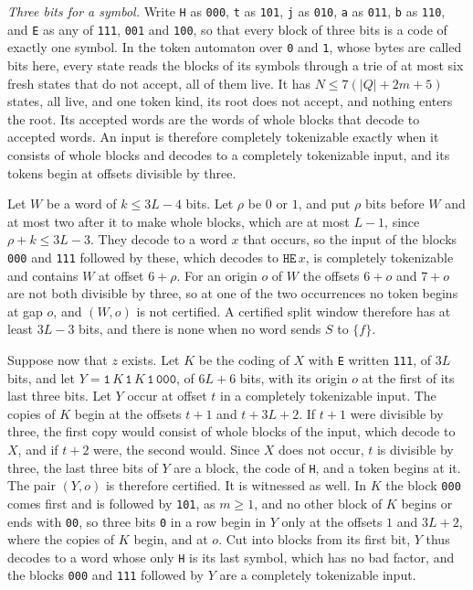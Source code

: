 \documentclass[11pt,a4paper]{article}
\theoremstyle{definition}
\theoremstyle{plain}
\newcommand{\code}[1]{\texttt{#1}}
\begin{document}
\emph{Three bits for a symbol.} Write \code{H} as \code{000}, \code{t} as \code{101}, \code{j} as \code{010}, \code{a}
as \code{011}, \code{b} as \code{110}, and \code{E} as any of \code{111}, \code{001} and \code{100}, so that every block
of three bits is a code of exactly one symbol. In the token automaton over \code{0} and \code{1}, whose bytes are called
bits here, every state reads the blocks of its symbols through a trie of at most six fresh states that do not accept,
all of them live. It has $N \leq 7 (|Q| + 2m + 5)$ states, all live, and one token kind, its root does not accept, and
nothing enters the root. Its accepted words are the words of whole blocks that decode to accepted words. An input is
therefore completely tokenizable exactly when it consists of whole blocks and decodes to a completely tokenizable input,
and its tokens begin at offsets divisible by three.

Let $W$ be a word of $k \leq 3L - 4$ bits. Let $\rho$ be $0$ or $1$, and put $\rho$ bits before $W$ and at most two
after it to make whole blocks, which are at most $L - 1$, since $\rho + k \leq 3L - 3$. They decode to a word $x$ that
occurs, so the input of the blocks \code{000} and \code{111} followed by these, which decodes to $\code{H}\code{E}\, x$,
is completely tokenizable and contains $W$ at offset $6 + \rho$. For an origin $o$ of $W$ the offsets $6 + o$ and
$7 + o$ are not both divisible by three, so at one of the two occurrences no token begins at gap $o$, and $(W, o)$ is
not certified. A certified split window therefore has at least $3L - 3$ bits, and there is none when no word sends $S$
to $\{f\}$.

Suppose now that $z$ exists. Let $K$ be the coding of $X$ with \code{E} written \code{111}, of $3L$ bits, and let
$Y = \code{1}\, K\, \code{1}\, K\, \code{1}\, \code{000}$, of $6L + 6$ bits, with its origin $o$ at the first of its
last three bits. Let $Y$ occur at offset $t$ in a completely tokenizable input. The copies of $K$ begin at the offsets
$t + 1$ and $t + 3L + 2$. If $t + 1$ were divisible by three, the first copy would consist of whole blocks of the input,
which decode to $X$, and if $t + 2$ were, the second would. Since $X$ does not occur, $t$ is divisible by three, the
last three bits of $Y$ are a block, the code of \code{H}, and a token begins at it. The pair $(Y, o)$ is therefore
certified. It is witnessed as well. In $K$ the block \code{000} comes first and is followed by \code{101}, as
$m \geq 1$, and no other block of $K$ begins or ends with \code{00}, so three bits \code{0} in a row begin in $Y$ only
at the offsets $1$ and $3L + 2$, where the copies of $K$ begin, and at $o$. Cut into blocks from its first bit, $Y$ thus
decodes to a word whose only \code{H} is its last symbol, which has no bad factor, and the blocks \code{000} and
\code{111} followed by $Y$ are a completely tokenizable input.
\end{document}
